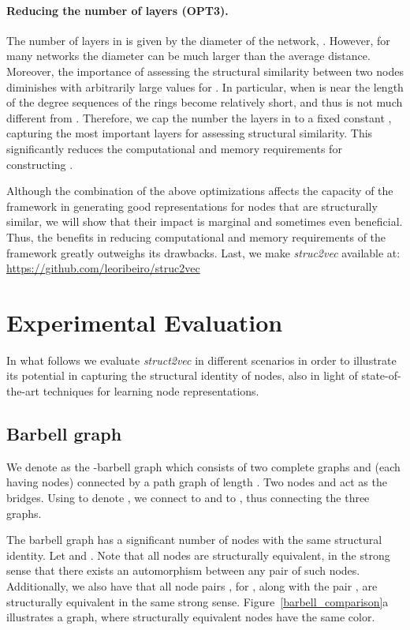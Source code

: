 \documentclass[sigconf]{acmart}
\begin{document}
\paragraph{Reducing the number of layers (OPT3).}
The number of layers in  is given by the diameter of the network, . However, for many networks the diameter can be much larger than the average distance. Moreover, the importance of assessing the structural similarity between two nodes diminishes with arbitrarily large values for . In particular, when  is near  the length of the degree sequences of the rings become relatively short, and thus  is not much different from . Therefore, we cap the number the layers in  to a fixed constant , capturing the most important layers for assessing structural similarity. This significantly reduces the computational and memory requirements for constructing . 



Although the combination of the above optimizations affects the capacity of the framework in generating good representations for nodes that are structurally similar, we will show that their impact is marginal and sometimes even beneficial. Thus, the benefits in reducing computational and memory requirements of the framework greatly outweighs its drawbacks. Last, we make \textit{struc2vec} available at: \url{https://github.com/leoribeiro/struc2vec}

 \section{Experimental Evaluation} \label{sec:experiments}

In what follows we evaluate \textit{struct2vec} in different scenarios in order to illustrate its potential in capturing the structural identity of nodes, also in light of state-of-the-art techniques for learning node representations.  

\subsection{Barbell graph}



We denote  as the -barbell graph which consists of two complete graphs  and  (each having  nodes) connected by a path graph  of length . Two nodes  and  act as the bridges. Using  to denote , we connect  to  and  to , thus connecting the three graphs.

The barbell graph has a significant number of nodes with the same structural identity. Let  and . Note that all nodes  are structurally equivalent, in the strong sense that there exists an automorphism between any pair of such nodes. Additionally, we also have that all node pairs , for , along with the pair , are structurally equivalent in the same strong sense. Figure~\ref{barbell_comparison}a illustrates a  graph, where structurally equivalent nodes have the same color.
\end{document}
